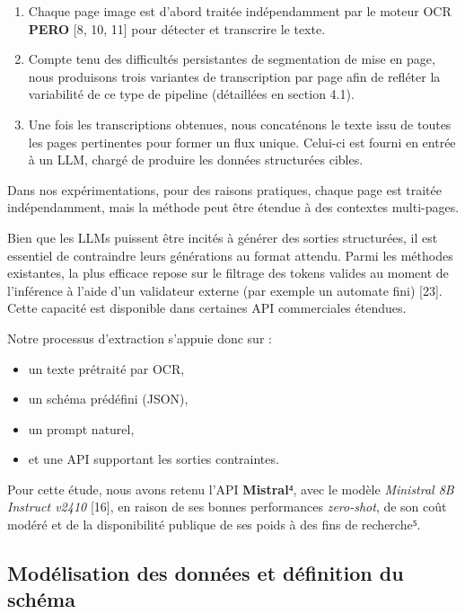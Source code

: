 \begin{enumerate}
\item Chaque page image est d’abord traitée indépendamment par le moteur OCR \textbf{PERO} [8, 10, 11] pour détecter et transcrire le texte.
\item Compte tenu des difficultés persistantes de segmentation de mise en page, nous produisons trois variantes de transcription par page afin de refléter la variabilité de ce type de pipeline (détaillées en section 4.1).
\item Une fois les transcriptions obtenues, nous concaténons le texte issu de toutes les pages pertinentes pour former un flux unique. Celui-ci est fourni en entrée à un LLM, chargé de produire les données structurées cibles.

\end{enumerate}
Dans nos expérimentations, pour des raisons pratiques, chaque page est traitée indépendamment, mais la méthode peut être étendue à des contextes multi-pages.

Bien que les LLMs puissent être incités à générer des sorties structurées, il est essentiel de contraindre leurs générations au format attendu. Parmi les méthodes existantes, la plus efficace repose sur le filtrage des tokens valides au moment de l’inférence à l’aide d’un validateur externe (par exemple un automate fini) [23]. Cette capacité est disponible dans certaines API commerciales étendues.

Notre processus d’extraction s’appuie donc sur :

\begin{itemize}
\item un texte prétraité par OCR,
\item un schéma prédéfini (JSON),
\item un prompt naturel,
\item et une API supportant les sorties contraintes.

\end{itemize}
Pour cette étude, nous avons retenu l’API \textbf{Mistral}⁴, avec le modèle \emph{Ministral 8B Instruct v2410} [16], en raison de ses bonnes performances \emph{zero-shot}, de son coût modéré et de la disponibilité publique de ses poids à des fins de recherche⁵.

\subsection{Modélisation des données et définition du schéma}

